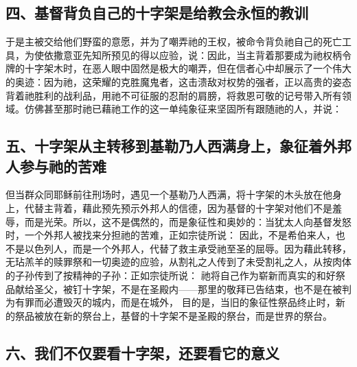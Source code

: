 
\subsection{四、基督背负自己的十字架是给教会永恒的教训}

于是主被交给他们野蛮的意愿，并为了嘲弄祂的王权，被命令背负祂自己的死亡工具，为使依撒意亚先知所预见的得以应验，说：因此，当主背着那要成为祂权柄令牌的十字架木时，在恶人眼中固然是极大的嘲弄，但在信者心中却展示了一个伟大的奥迹：因为祂，这荣耀的克胜魔鬼者，这击溃敌对权势的强者，正以高贵的姿态背着祂胜利的战利品，用祂不可征服的忍耐的肩膀，将救恩可敬的记号带入所有领域。仿佛甚至那时祂已藉祂工作的这一单纯象征来坚固所有跟随祂的人，并说： \par


\subsection{五、十字架从主转移到基勒乃人西满身上，象征着外邦人参与祂的苦难}

但当群众同耶稣前往刑场时，遇见一个基勒乃人西满，将十字架的木头放在他身上，代替主背着，藉此预先预示外邦人的信德，因为基督的十字架对他们不是羞辱，而是光荣。所以，这不是偶然的，而是象征性和奥妙的：当犹太人向基督发怒时，一个外邦人被找来分担祂的苦难，正如宗徒所说： 因此，不是希伯来人，也不是以色列人，而是一个外邦人，代替了救主承受祂至圣的屈辱。因为藉此转移，无玷羔羊的赎罪祭和一切奥迹的应验，从割礼之人传到了未受割礼之人，从按肉体的子孙传到了按精神的子孙：正如宗徒所说： 祂将自己作为崭新而真实的和好祭品献给圣父，被钉十字架，不是在圣殿内——那里的敬拜已告结束，也不是在被判为有罪而必遭毁灭的城内，而是在城外， 目的是，当旧的象征性祭品终止时，新的祭品被放在新的祭台上，基督的十字架不是圣殿的祭台，而是世界的祭台。\par


\subsection{六、我们不仅要看十字架，还要看它的意义}


